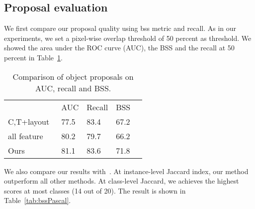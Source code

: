 \documentclass[10pt,twocolumn,letterpaper]{article}
\begin{document}
\subsection{Proposal evaluation}
We first compare our proposal quality using bss metric and recall. As in our experiments, we set a pixel-wise overlap threshold of 50 percent as threshold. We showed the area under the ROC curve (AUC), the BSS and the recall at 50 percent in Table~\ref{tab:bsds}.

\begin{table}
\begin{center}
\begin{tabular}{|l|l|l|l|l}
\cline{1-4}
 & AUC  & Recall & BSS  &  \\ \cline{1-4}
C,T+layout~\cite{Endres14} & 77.5 & 83.4   & 67.2 &  \\ \cline{1-4}
all feature~\cite{Endres14} & 80.2 & 79.7   & 66.2 &  \\ \cline{1-4}
Ours & 81.1 & 83.6   & 71.8 &  \\ \cline{1-4}
\end{tabular}
\end{center}
\caption{Comparison of object proposals on AUC, recall and BSS.}
\label{tab:bsds}
\end{table}

We also compare our results with~\cite{Alexe12, Kim12, Carreira12, Arbelaez12, Sande11, Endres14, Arbelaez14}. At instance-level Jaccard index, our method outperform all other methods. At class-level Jaccard, we achieves the highest scores at most classes (14 out of 20). The result is shown in Table~\ref{tab:bssPascal}.  
\end{document}

